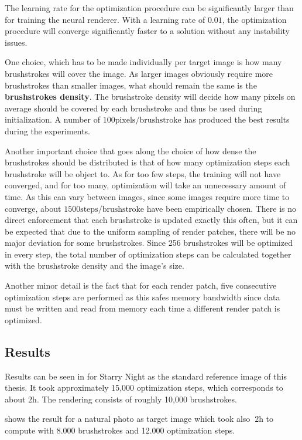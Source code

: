 The learning rate for the optimization procedure can be significantly larger than for training the neural renderer.
With a learning rate of $0.01$, the optimization procedure will converge significantly faster to a solution without any instability issues.

One choice, which has to be made individually per target image is how many brushstrokes will cover the image.
As larger images obviously require more brushstrokes than smaller images, what should remain the same is the \textbf{brushstrokes density}.
The brushstroke density will decide how many pixels on average should be covered by each brushstroke and thus be used during initialization.
A number of $100 \text{pixels}/\text{brushstroke}$ has produced the best results during the experiments.

Another important choice that goes along the choice of how dense the brushstrokes should be distributed is that of how many optimization steps each brushstroke will be object to.
As for too few steps, the training will not have converged, and for too many, optimization will take an unnecessary amount of time.
As this can vary between images, since some images require more time to converge, about $1500 \text{steps}/\text{brushstroke}$ have been empirically chosen.
There is no direct enforcement that each brushstroke is updated exactly this often, but it can be expected that due to the uniform sampling of render patches, there will be no major deviation for some brushstrokes.
Since 256 brushstrokes will be optimized in every step, the total number of optimization steps can be calculated together with the brushstroke density and the image's size.

Another minor detail is the fact that for each render patch, five consecutive optimization steps are performed as this safes memory bandwidth since data must be written and read from memory each time a different render patch is optimized.

\subsection{Results}

Results can be seen in  for Starry Night as the standard reference image of this thesis.
It took approximately 15,000 optimization steps, which corresponds to about $2\si{\hour}$.
The rendering consists of roughly 10,000 brushstrokes.

 shows the result for a natural photo as target image which took
also $~2\si{\hour}$ to compute with 8.000 brushstrokes and 12.000 optimization steps.

